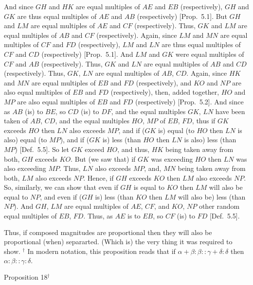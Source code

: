 And since $GH$ and $HK$ are equal multiples of $AE$ and $EB$ (respectively), 
$GH$ and $GK$ are thus equal multiples of $AE$ and $AB$ (respectively) [Prop.~5.1]. But $GH$ and $LM$ are equal
multiples of $AE$ and $CF$ (respectively). Thus, $GK$ and $LM$ are equal
multiples of $AB$ and $CF$ (respectively). Again, since $LM$ and $MN$ are equal
multiples of $CF$ and $FD$ (respectively), $LM$ and $LN$ are thus equal multiples
of $CF$ and $CD$ (respectively) [Prop.~5.1]. 
And $LM$ and $GK$ were equal multiples of $CF$ and $AB$ (respectively).
Thus, $GK$ and $LN$ are equal multiples of $AB$ and $CD$ (respectively).
Thus, $GK$, $LN$ are equal multiples of $AB$, $CD$. Again, since
$HK$ and $MN$ are equal multiples of $EB$ and $FD$ (respectively), and $KO$
and $NP$ are also  equal multiples of $EB$ and $FD$ (respectively),  then, added together, $HO$ and $MP$ are also equal multiples of $EB$ and $FD$ (respectively) [Prop.~5.2]. And since as $AB$ (is) to $BE$, so
$CD$ (is) to $DF$, and the equal multiples $GK$, $LN$ have been
taken of $AB$, $CD$, and the equal multiples $HO$, $MP$ of $EB$, $FD$, thus 
if $GK$ exceeds $HO$ then $LN$ also exceeds $MP$, and if ($GK$ is) equal
(to $HO$ then $LN$ is also) equal (to $MP$), and if ($GK$ is) less (than $HO$ then
$LN$ is also) less (than $MP$) [Def.~5.5]. So let $GK$ exceed $HO$, and thus, $HK$ being taken away from
both, $GH$ exceeds $KO$. But (we saw that) if $GK$ was exceeding $HO$ then
$LN$ was also exceeding $MP$. Thus, $LN$ also exceeds $MP$, and, $MN$ being
taken away from both, $LM$ also exceeds $NP$.  Hence, if $GH$ exceeds $KO$
then $LM$ also exceeds $NP$. So, similarly, we can show that even if
$GH$ is equal to $KO$ then $LM$ will also be equal to $NP$, and
even if ($GH$ is) less (than $KO$ then $LM$ will also be) less (than $NP$).
And $GH$, $LM$ are equal multiples of $AE$, $CF$, and $KO$, $NP$ other random
equal multiples of $EB$, $FD$. Thus, as $AE$ is to $EB$, so  $CF$ (is) to $FD$ [Def.~5.5].

Thus, if composed magnitudes are proportional then they will also be proportional (when)
separarted. (Which is) the very thing it was required to show.
{\footnotesize \noindent$^\dag$ In modern notation, this proposition
reads that if $\alpha+\beta:\beta::\gamma+\delta:\delta$ then $\alpha:\beta::
\gamma:\delta$.}


\begin{center}
{\large Proposition 18}$^\dag$
\end{center}

